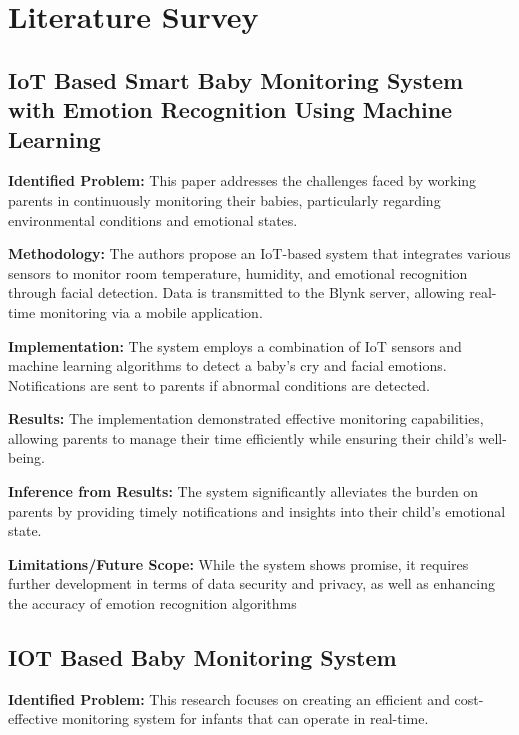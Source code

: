 \documentclass[12pt,a4paper]{report}
\begin{document}
\chapter{Literature Survey}

\section{IoT Based Smart Baby Monitoring System with Emotion Recognition Using Machine Learning}

\textbf{Identified Problem: }This paper addresses the challenges faced by working parents in continuously monitoring their babies, particularly regarding environmental conditions and emotional states\cite{alam2023iot}.
\setlength{\parskip}{1em}  %

\noindent\textbf{Methodology:} The authors propose an IoT-based system that integrates various sensors to monitor room temperature, humidity, and emotional recognition through facial detection. Data is transmitted to the Blynk server, allowing real-time monitoring via a mobile application.
\setlength{\parskip}{1em}  %

\noindent\textbf{Implementation:} The system employs a combination of IoT sensors and machine learning algorithms to detect a baby's cry and facial emotions. Notifications are sent to parents if abnormal conditions are detected.
\setlength{\parskip}{1em}  %

\noindent\textbf{Results:} The implementation demonstrated effective monitoring capabilities, allowing parents to manage their time efficiently while ensuring their child's well-being.
\setlength{\parskip}{1em}  %

\noindent\textbf{Inference from Results:} The system significantly alleviates the burden on parents by providing timely notifications and insights into their child's emotional state.
\setlength{\parskip}{1em}  %

\noindent\textbf{Limitations/Future Scope:} While the system shows promise, it requires further development in terms of data security and privacy, as well as enhancing the accuracy of emotion recognition algorithms
\setlength{\parskip}{1em}  %

\section{IOT Based Baby Monitoring System}
\textbf{Identified Problem: } This research focuses on creating an efficient and cost-effective monitoring system for infants that can operate in real-time\cite{Singh2021}.
\end{document}
